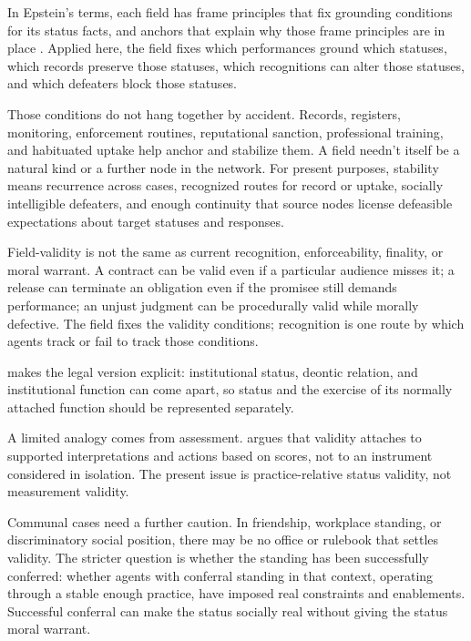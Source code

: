 \documentclass[12pt]{article}
\begin{document}
In Epstein's terms, each field has frame principles that fix grounding conditions for its status facts, and anchors that explain why those frame principles are in place \citep{epstein2015AntTrap}. Applied here, the field fixes which performances ground which statuses, which records preserve those statuses, which recognitions can alter those statuses, and which defeaters block those statuses.

Those conditions do not hang together by accident. Records, registers, monitoring, enforcement routines, reputational sanction, professional training, and habituated uptake help anchor and stabilize them. A field needn't itself be a natural kind or a further node in the network. For present purposes, stability means recurrence across cases, recognized routes for record or uptake, socially intelligible defeaters, and enough continuity that source nodes license defeasible expectations about target statuses and responses.

Field-validity is not the same as current recognition, enforceability, finality, or moral warrant. A contract can be valid even if a particular audience misses it; a release can terminate an obligation even if the promisee still demands performance; an unjust judgment can be procedurally valid while morally defective. The field fixes the validity conditions; recognition is one route by which agents track or fail to track those conditions.

\textcite[pp.~6--8]{almang2016LegalFacts} makes the legal version explicit: institutional status, deontic relation, and institutional function can come apart, so status and the exercise of its normally attached function should be represented separately.

A limited analogy comes from assessment. \textcite{messick1995Validity} argues that validity attaches to supported interpretations and actions based on scores, not to an instrument considered in isolation. The present issue is practice-relative status validity, not measurement validity.

Communal cases need a further caution. In friendship, workplace standing, or discriminatory social position, there may be no office or rulebook that settles validity. The stricter question is whether the standing has been successfully conferred: whether agents with conferral standing in that context, operating through a stable enough practice, have imposed real constraints and enablements. Successful conferral can make the status socially real without giving the status moral warrant.
\end{document}
